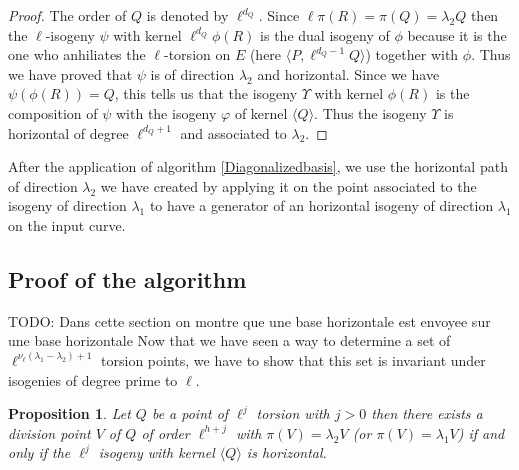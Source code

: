 \documentclass{lms}
\newcommand{\todo}[1]{{\color{red}TODO: #1}}
\newtheorem{prop}[thm]{Proposition}
\begin{document}
\begin{proof}
The order of $Q$ is denoted by $\ell^{d_Q}$. Since $\ell \pi(R)=\pi(Q)=\lambda_2Q$ then the $\ell$-isogeny $\psi$ with kernel $\ell^{d_Q}\phi(R)$ is the dual isogeny of $\phi$ because it is the one who anhiliates the $\ell$-torsion on $E$ (here $\langle P, \ell^{d_Q-1}Q \rangle$) together with $\phi$. Thus we have proved that $\psi$ is of direction $\lambda_2$ and horizontal. 
\newline
Since we have $\psi(\phi(R))=Q$, this tells us that the isogeny $\Upsilon$ with kernel $\phi(R)$ is the composition of $\psi$ with the isogeny $\varphi$ of kernel $\langle Q \rangle$. Thus the isogeny $\Upsilon$ is horizontal of degree $\ell^{d_Q+1}$ and associated to $\lambda_2$. 
\end{proof}

After the application of algorithm \ref{Diagonalizedbasis}, we use the horizontal path of direction $\lambda_2$ we have created by applying it on the point associated to the isogeny of direction $\lambda_1$ to have a generator of an horizontal isogeny of direction $\lambda_1$ on the input curve.%


\subsection{Proof of the algorithm}
\todo{Dans cette section on montre que une base horizontale est envoyee sur une base horizontale}
Now that we have seen a way to determine a set of $\ell^{\nu_{\ell}(\lambda_1-\lambda_2)+1}$ torsion points, we have to show that this set is invariant under isogenies of degree prime to $\ell$.

\begin{prop}
Let $Q$ be a point of $\ell^j$ torsion with $j>0$ then there exists a division point $V$ of $Q$ of order $\ell^{h+j}$ with $\pi(V)=\lambda_2V$ (or $\pi(V)=\lambda_1V$) if and only if the $\ell^j$ isogeny with kernel $\langle Q \rangle $ is horizontal.
\end{prop}
\end{document}
